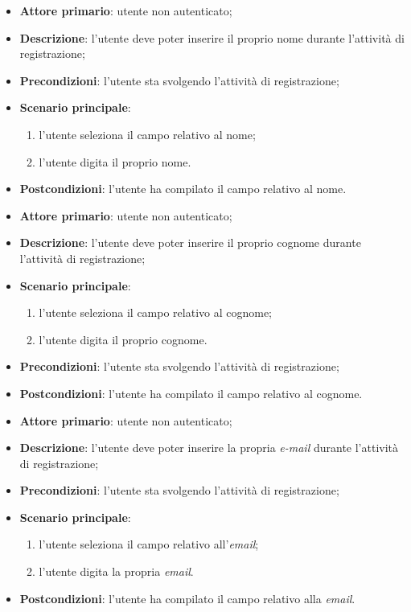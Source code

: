 \label{uc:signup_nome}
\begin{itemize}
    \item \textbf{Attore primario}: utente non autenticato;
    \item \textbf{Descrizione}: l'utente deve poter inserire il proprio nome durante l'attività di registrazione;
    \item \textbf{Precondizioni}: l'utente sta svolgendo l'attività di registrazione;
    \item \textbf{Scenario principale}:
    \begin{enumerate}
        \item l'utente seleziona il campo relativo al nome;
        \item l'utente digita il proprio nome.
    \end{enumerate}
    \item \textbf{Postcondizioni}: l'utente ha compilato il campo relativo al nome.
\end{itemize}

\label{uc:signup_cognome}
\begin{itemize}
    \item \textbf{Attore primario}: utente non autenticato;
    \item \textbf{Descrizione}: l'utente deve poter inserire il proprio cognome durante l'attività di registrazione;
    \item \textbf{Scenario principale}:
    \begin{enumerate}
        \item l'utente seleziona il campo relativo al cognome;
        \item l'utente digita il proprio cognome.
    \end{enumerate}
    \item \textbf{Precondizioni}: l'utente sta svolgendo l'attività di registrazione;
    \item \textbf{Postcondizioni}: l'utente ha compilato il campo relativo al cognome.
\end{itemize}

\label{uc:signup_mail}
\begin{itemize}
    \item \textbf{Attore primario}: utente non autenticato;
    \item \textbf{Descrizione}: l'utente deve poter inserire la propria \textit{e-mail} durante l'attività di registrazione;
    \item \textbf{Precondizioni}: l'utente sta svolgendo l'attività di registrazione;
    \item \textbf{Scenario principale}:
    \begin{enumerate}
        \item l'utente seleziona il campo relativo all'\textit{email};
        \item l'utente digita la propria \textit{email}.
    \end{enumerate}
    \item \textbf{Postcondizioni}: l'utente ha compilato il campo relativo alla \textit{email}.
\end{itemize}

